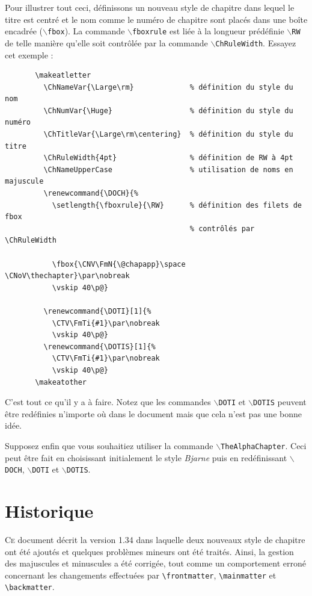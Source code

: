 \documentclass{report}
\newcommand{\A}[1]{{$\backslash${\tt #1}}}
\begin{document}
    Pour illustrer tout ceci, définissons un nouveau style de chapitre dans
    lequel le titre est centré et le nom comme le numéro de chapitre sont 
    placés dans une boîte encadrée (\A{fbox}). La commande \A{fboxrule} est 
    liée à la longueur prédéfinie \A{RW} de telle manière qu'elle soit 
    contrôlée par la commande \A{ChRuleWidth}. Essayez cet exemple :
    \begin{verbatim}
       \makeatletter
         \ChNameVar{\Large\rm}             % définition du style du nom
         \ChNumVar{\Huge}                  % définition du style du numéro
         \ChTitleVar{\Large\rm\centering}  % définition du style du titre
         \ChRuleWidth{4pt}                 % définition de RW à 4pt
         \ChNameUpperCase                  % utilisation de noms en majuscule
         \renewcommand{\DOCH}{%
           \setlength{\fboxrule}{\RW}      % définition des filets de fbox 
                                           % contrôlés par \ChRuleWidth

           \fbox{\CNV\FmN{\@chapapp}\space \CNoV\thechapter}\par\nobreak
           \vskip 40\p@}

         \renewcommand{\DOTI}[1]{%
           \CTV\FmTi{#1}\par\nobreak
           \vskip 40\p@}
         \renewcommand{\DOTIS}[1]{%
           \CTV\FmTi{#1}\par\nobreak
           \vskip 40\p@}
       \makeatother
    \end{verbatim}

    C'est tout ce qu'il y a à faire. Notez que les commandes \A{DOTI} et
    \A{DOTIS} peuvent être redéfinies n'importe où dans le document mais que 
    cela n'est pas une bonne idée. 

    Supposez enfin que vous souhaitiez utiliser la commande 
    \A{TheAlphaChapter}. Ceci peut être fait en choisissant initialement le
    style \emph{Bjarne} puis en redéfinissant \A{DOCH}, \A{DOTI} et \A{DOTIS}.


  \chapter{Historique}
    \lettrine[findent=0.2em,nindent=0em,realheight=true]{C}{e} 
    document décrit la version 1.34 dans laquelle deux nouveaux style de 
    chapitre ont été ajoutés et quelques problèmes mineurs ont été traités. 
    Ainsi, la gestion des majuscules et minuscules a été corrigée, tout comme
    un comportement erroné concernant les changements effectuées par 
    \verb+\frontmatter+, \verb+\mainmatter+ et \verb+\backmatter+.   
\end{document}
